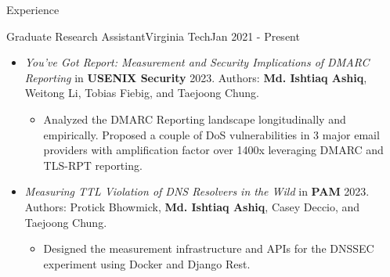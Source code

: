 \documentclass[]{mcdowellcv}
\begin{document}
\begin{cvsection}{Experience}
\begin{cvsubsection}{Graduate Research Assistant}{Virginia Tech}{Jan 2021 - Present}
\begin{itemize}
\begin{itemize}
\begin{itemize}
					\end{itemize}
					\item \textit{You’ve Got Report: Measurement and Security Implications of DMARC Reporting} in \textbf{USENIX Security} 2023. Authors: \textbf{Md. Ishtiaq Ashiq}, Weitong Li, Tobias Fiebig, and Taejoong Chung. %
					\begin{itemize}
						\item Analyzed the DMARC Reporting landscape longitudinally and empirically. Proposed a couple of DoS vulnerabilities
						in 3 major email providers with amplification factor over 1400x leveraging DMARC and TLS-RPT reporting.
					\end{itemize}
					\item \textit{Measuring TTL Violation of DNS Resolvers in the Wild} in \textbf{PAM} 2023. Authors: Protick Bhowmick, \textbf{Md. Ishtiaq Ashiq}, Casey Deccio, and Taejoong Chung. %
					\begin{itemize}
						\item Designed the measurement infrastructure and APIs for the DNSSEC experiment using Docker and Django Rest.
					\end{itemize}
				\end{itemize}
			\end{itemize}
		\end{cvsubsection}
		

\end{cvsection}
\end{document}
